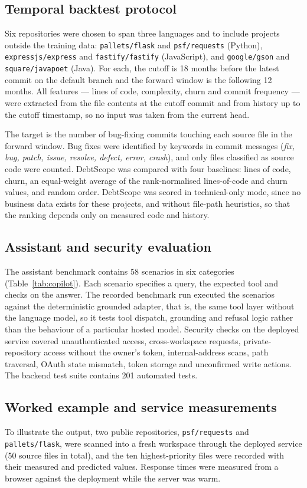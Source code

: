 \documentclass[conference]{IEEEtran}
\begin{document}
\subsection{Temporal backtest protocol}
Six repositories were chosen to span three languages and to include projects outside the training data: \texttt{pallets/flask} and \texttt{psf/requests} (Python), \texttt{expressjs/express} and \texttt{fastify/fastify} (JavaScript), and \texttt{google/gson} and \texttt{square/javapoet} (Java). For each, the cutoff is 18 months before the latest commit on the default branch and the forward window is the following 12 months. All features --- lines of code, complexity, churn and commit frequency --- were extracted from the file contents at the cutoff commit and from history up to the cutoff timestamp, so no input was taken from the current head.

The target is the number of bug-fixing commits touching each source file in the forward window. Bug fixes were identified by keywords in commit messages (\textit{fix, bug, patch, issue, resolve, defect, error, crash}), and only files classified as source code were counted. DebtScope was compared with four baselines: lines of code, churn, an equal-weight average of the rank-normalised lines-of-code and churn values, and random order. DebtScope was scored in technical-only mode, since no business data exists for these projects, and without file-path heuristics, so that the ranking depends only on measured code and history.

\subsection{Assistant and security evaluation}
The assistant benchmark contains 58 scenarios in six categories (Table~\ref{tab:copilot}). Each scenario specifies a query, the expected tool and checks on the answer. The recorded benchmark run executed the scenarios against the deterministic grounded adapter, that is, the same tool layer without the language model, so it tests tool dispatch, grounding and refusal logic rather than the behaviour of a particular hosted model. Security checks on the deployed service covered unauthenticated access, cross-workspace requests, private-repository access without the owner's token, internal-address scans, path traversal, OAuth state mismatch, token storage and unconfirmed write actions. The backend test suite contains 201 automated tests.

\subsection{Worked example and service measurements}
To illustrate the output, two public repositories, \texttt{psf/requests} and \texttt{pallets/flask}, were scanned into a fresh workspace through the deployed service (50 source files in total), and the ten highest-priority files were recorded with their measured and predicted values. Response times were measured from a browser against the deployment while the server was warm.
\end{document}
